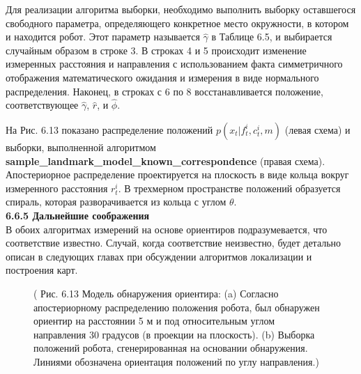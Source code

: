 \documentclass[10pt,a4paper]{article}
\begin{document}
Для реализации алгоритма выборки, необходимо выполнить выборку оставшегося свободного параметра, определяющего конкретное место окружности, в котором и находится робот. Этот параметр называется $\hat{\gamma}$ в Таблице 6.5, и выбирается случайным образом в строке 3. В строках 4 и 5 происходит изменение измеренных расстояния и направления с использованием факта симметричного отображения математического ожидания и измерения в виде нормального распределения. Наконец, в строках с 6 по 8 восстанавливается положение, соответствующее $\hat{\gamma}$, $\hat{r}$, и $\hat{\phi}$.

На Рис. 6.13 показано распределение положений $p(x_t | f_t^i, c^i_t, m)$ (левая схема)  и выборки, выполненной алгоритмом \textbf{sample\_landmark\_model\_known\_correspondence} (правая схема). Апостериорное распределение проектируется на плоскость в виде кольца вокруг измеренного расстояния $r_t^i$. В трехмерном пространстве положений образуется спираль, которая разворачивается из кольца с углом $\theta$.\\

\textbf{6.6.5 Дальнейшие соображения}\\

В обоих алгоритмах измерений на основе ориентиров подразумевается, что соответствие известно. Случай, когда соответствие неизвестно, будет детально описан в следующих главах при обсуждении алгоритмов локализации и построения карт. 

\begin{figure}[H]
	\caption{ (  Рис. 6.13 Модель обнаружения ориентира: (a) Согласно апостериорному распределению положения робота, был обнаружен ориентир на расстоянии 5 м и под относительным углом направления 30 градусов (в проекции на плоскость). (b) Выборка положений робота, сгенерированная на основании обнаружения. Линиями обозначена ориентация положений по углу направления.)}
	\label{fig:613orig}
\end{figure}
\end{document}
